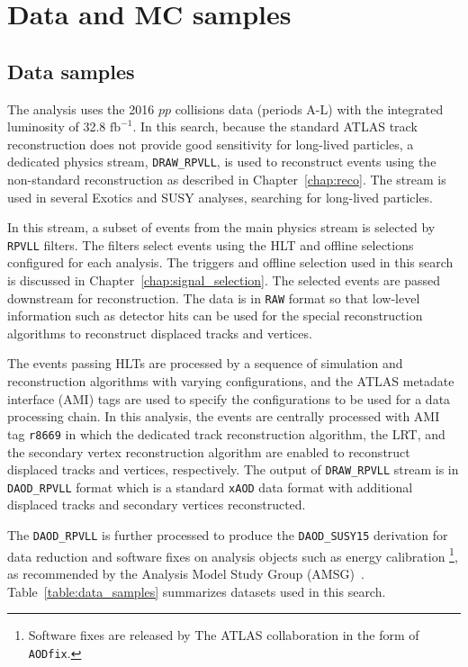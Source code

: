 \chapter{Data and MC samples}
\label{chap:data_mc}

\section{Data samples}
\label{sec:data_mc:data}

The analysis uses the 2016 $pp$ collisions data (periods A-L) with the integrated luminosity of 32.8 $\mathrm{fb^{-1}}$. In this search, because the standard ATLAS track reconstruction does not provide good sensitivity for long-lived particles, a dedicated physics stream, \texttt{DRAW\_RPVLL}, is used to reconstruct events using the non-standard reconstruction as described in Chapter~\ref{chap:reco}. The stream is used in several Exotics and SUSY analyses, searching for long-lived particles. %

In this stream, a subset of events from the main physics stream is selected by \texttt{RPVLL} filters. The filters select events using the HLT and offline selections configured for each analysis. The triggers and offline selection used in this search is discussed in Chapter~\ref{chap:signal_selection}. The selected events are passed downstream for reconstruction. The data is in \texttt{RAW} format so that low-level information such as detector hits can be used for the special reconstruction algorithms to reconstruct displaced tracks and vertices.

The events passing HLTs are processed by a sequence of simulation and reconstruction algorithms with varying configurations, and the ATLAS metadate interface (AMI) tags are used to specify the configurations to be used for a data processing chain. In this analysis, the events are centrally processed with AMI tag \texttt{r8669} in which the dedicated track reconstruction algorithm, the LRT, and the secondary vertex reconstruction algorithm are enabled to reconstruct displaced tracks and vertices, respectively. The output of \texttt{DRAW\_RPVLL} stream is in \texttt{DAOD\_RPVLL} format which is a standard \texttt{xAOD} data format with additional displaced tracks and secondary vertices reconstructed. 

The \texttt{DAOD\_RPVLL} is further processed to produce the \texttt{DAOD\_SUSY15} derivation for data reduction and software fixes on analysis objects such as energy calibration \footnote{Software fixes are released by The ATLAS collaboration in the form of \texttt{AODfix}.}, as recommended by the Analysis Model Study Group (AMSG)~\cite{Catmore:1543445}. Table~\ref{table:data_samples} summarizes datasets used in this search.

